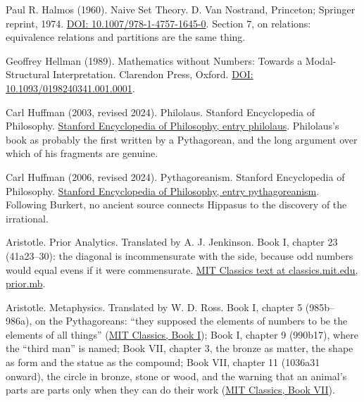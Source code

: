 \documentclass[11pt,twoside]{article}
\theoremstyle{thielethm}
\theoremstyle{thieledef}
\theoremstyle{thieledef}
\theoremstyle{thieledef}
\theoremstyle{thielethm}
\theoremstyle{thieleobs}
\theoremstyle{thielethm}
\begin{document}
\noindent Paul R. Halmos (1960). Naive Set Theory. D. Van Nostrand, Princeton; Springer reprint, 1974. \href{https://doi.org/10.1007/978-1-4757-1645-0}{DOI: 10.1007/978-1-4757-1645-0}. Section 7, on relations: equivalence relations and partitions are the same thing.
\par\medskip

\noindent Geoffrey Hellman (1989). Mathematics without Numbers: Towards a Modal-Structural Interpretation. Clarendon Press, Oxford. \href{https://doi.org/10.1093/0198240341.001.0001}{DOI: 10.1093/0198240341.001.0001}.
\par\medskip

\noindent Carl Huffman (2003, revised 2024). Philolaus. Stanford Encyclopedia of Philosophy. \href{https://plato.stanford.edu/entries/philolaus/}{Stanford Encyclopedia of Philosophy, entry philolaus}. Philolaus's book as probably the first written by a Pythagorean, and the long argument over which of his fragments are genuine.
\par\medskip

\noindent Carl Huffman (2006, revised 2024). Pythagoreanism. Stanford Encyclopedia of Philosophy. \href{https://plato.stanford.edu/entries/pythagoreanism/}{Stanford Encyclopedia of Philosophy, entry pythagoreanism}. Following Burkert, no ancient source connects Hippasus to the discovery of the irrational.
\par\medskip

\noindent Aristotle. Prior Analytics. Translated by A. J. Jenkinson. Book I, chapter 23 (41a23--30): the diagonal is incommensurate with the side, because odd numbers would equal evens if it were commensurate. \href{http://classics.mit.edu/Aristotle/prior.mb.txt}{MIT Classics text at classics.mit.edu, prior.mb}.
\par\medskip

\noindent Aristotle. Metaphysics. Translated by W. D. Ross. Book I, chapter 5 (985b--986a), on the Pythagoreans: ``they supposed the elements of numbers to be the elements of all things'' (\href{http://classics.mit.edu/Aristotle/metaphysics.1.i.html}{MIT Classics, Book I}); Book I, chapter 9 (990b17), where the ``third man'' is named; Book VII, chapter 3, the bronze as matter, the shape as form and the statue as the compound; Book VII, chapter 11 (1036a31 onward), the circle in bronze, stone or wood, and the warning that an animal's parts are parts only when they can do their work (\href{http://classics.mit.edu/Aristotle/metaphysics.7.vii.html}{MIT Classics, Book VII}).
\par\medskip
\end{document}
